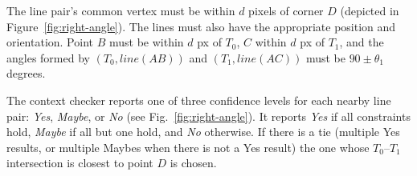 The line pair's common vertex must be within $d$ pixels of corner $D$
(depicted in Figure~\ref{fig:right-angle}). The lines must also have
the appropriate position and orientation. Point $B$ must be within $d$
px of $T_0$, $C$ within $d$ px of $T_1$, and the angles formed by
$(T_0, line(AB))$ and $(T_1, line(AC))$ must be $90\pm\theta_1$ degrees.




The context checker reports one of three confidence levels for each
nearby line pair: \textit{Yes}, \textit{Maybe}, or \textit{No} (see
Fig.~\ref{fig:right-angle}). It reports \textit{Yes} if all
constraints hold, \textit{Maybe} if all but one hold, and \textit{No}
otherwise. If there is a tie (multiple Yes results, or multiple Maybes
when there is not a Yes result) the one whose $T_0$--$T_1$
intersection is closest to point $D$ is chosen.

